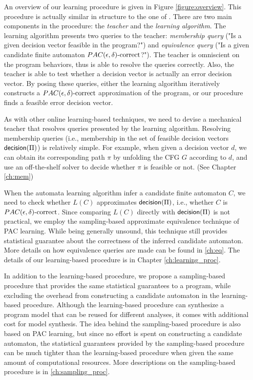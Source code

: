 An overview of our learning procedure is given in Figure \ref{figure:overview}. This procedure is actually similar in structure to the one of \cite{Angluin87}. There are two main components in the procedure: the \emph{teacher} and the \emph{learning algorithm}. The learning algorithm presents two queries to the teacher: \emph{membership query} ("Is a given decision vector feasible in the program?") and \emph{equivalence query} ("Is a given candidate finite automaton $PAC(\epsilon, \delta)\text{-correct}$?"). The teacher is omniscient on the program behaviors, thus is able to resolve the queries correctly. Also, the teacher is able to test whether a decision vector is actually an error decision vector. By posing these queries, either the learning algorithm iteratively constructs a $PAC(\epsilon, \delta)\text{-correct}$ approximation of the program, or our procedure finds a feasible error decision vector.

As with other online learning-based techniques, we need to devise a mechanical teacher that resolves queries presented by the learning algorithm. Resolving membership queries (i.e., membership in the set of feasible decision vectors $\mathsf{decision}(\Pi)$) is relatively simple. For example, when given a decision vector $d$, we can obtain its corresponding path $\pi$ by unfolding the CFG $G$ according to $d$, and use an off-the-shelf solver to decide whether $\pi$ is feasible or not. (See Chapter \ref{ch:mem})

When the automata learning algorithm infer a candidate finite automaton $C$, we need to check whether $L(C)$ approximates $\mathsf{decision}(\Pi)$, i.e., whether $C$ is $PAC(\epsilon, \delta)\text{-correct}$. Since comparing $L(C)$ directly with $\mathsf{decision}(\Pi)$ is not practical, we employ the sampling-based approximate equivalence technique of PAC learning. While being generally unsound, this technique still provides statistical guarantee about the correctness of the inferred candidate automaton. More details on how equivalence queries are made can be found in \ref{ch:eq}. The details of our learning-based procedure is in Chapter \ref{ch:learning_proc}. 

In addition to the learning-based procedure, we propose a sampling-based procedure that provides the same statistical guarantees to a program, while excluding the overhead from constructing a candidate automaton in the learning-based procedure. Although the learning-based procedure can synthesize a program model that can be reused for different analyses, it comes with additional cost for model synthesis. The idea behind the sampling-based procedure is also based on PAC learning, but since no effort is spent on constructing a candidate automaton, the statistical guarantees provided by the sampling-based procedure can be much tighter than the learning-based procedure when given the same amount of computational resources. More descriptions on the sampling-based procedure is in \ref{ch:sampling_proc}.

